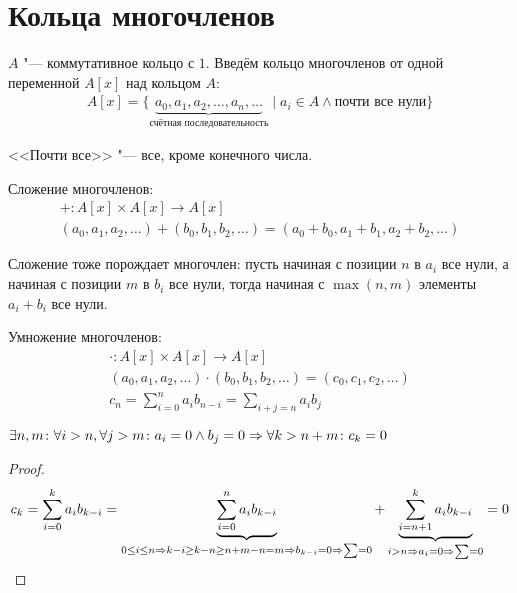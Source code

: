 \section{Кольца многочленов}

\begin{Def}
$A$ "--- коммутативное кольцо с $1$.
Введём кольцо многочленов от одной переменной $A[x]$ над кольцом $A$:
\begin{gather*}
A[x] = \{ \underbrace{a_0, a_1, a_2, \ldots, a_n, \ldots}_{\text{счётная последовательность}} \mid a_i \in A \land\text{почти все нули}\}
\end{gather*}
\end{Def}
		 
\begin{Rem}
<<Почти все>> "--- все, кроме конечного числа.
\end{Rem}
	 
\begin{Def}	
Сложение многочленов: 
\begin{gather*}
+\colon A[x] \times A[x] \to A[x] \\ 
(a_0, a_1, a_2, \ldots) + (b_0, b_1, b_2, \ldots) = (a_0 + b_0, a_1 + b_1, a_2 + b_2, \ldots)
\end{gather*}
\end{Def}
	
\begin{Rem}
Сложение тоже порождает многочлен: пусть начиная с позиции $n$ в $a_i$ все нули,
а начиная с позиции $m$ в $b_i$ все нули, тогда начиная с $\max(n, m)$ элементы $a_i+b_i$ все нули.
\end{Rem}
	 
\begin{Def}	
Умножение многочленов:
\begin{gather*}
\cdot\colon A[x] \times A[x] \to A[x] \\
(a_0, a_1, a_2, \ldots) \cdot (b_0, b_1, b_2, \ldots) = (c_0, c_1, c_2, \ldots) \\
c_n = \sum_{i=0}^n a_ib_{n - i} = \sum_{i + j = n} a_ib_j
\end{gather*}
\end{Def}
		 
\begin{Rem}
$\exists n, m\colon \forall i>n, \forall j>m \colon a_i = 0 \land b_j = 0 \Rightarrow \forall k > n + m\colon c_k = 0 $
\end{Rem}
	
\begin{proof}
\begin{gather*}
c_k = \sum_{i=0}^k a_ib_{k - i} = \underbrace{\sum_{i=0}^n a_ib_{k - i}}_{0\leq i\leq n \Rightarrow k-i \geq k-n \geq n+m-n = m \Rightarrow b_{k - i} = 0 \Rightarrow \sum = 0} +
\underbrace{\sum_{i=n+1}^k a_ib_{k-i}}_{i>n \Rightarrow a_i = 0 \Rightarrow \sum = 0} = 0
\end{gather*}
\end{proof}	
	
